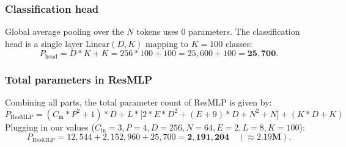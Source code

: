 \subsubsection{Classification head}
Global average pooling over the $N$ tokens uses 0 parameters. The classification head is a single layer $\text{Linear}(D, K)$ mapping to $K=100$ classes:
\begin{equation}
    P_{\text{head}} = D * K + K = 256 * 100 + 100 = 25,600 + 100 = \mathbf{25,700}.
\end{equation}

\subsubsection{Total parameters in ResMLP}
Combining all parts, the total parameter count of ResMLP is given by:
\begin{equation}
    \label{eq:resmlp_param_formula}
    \boxed{P_{\text{ResMLP}} = (C_{\text{in}} * P^2 + 1) * D + L * \Big[ 2 * E * D^2 + (E + 9) * D + N^2 + N \Big] + (K * D + K)}
\end{equation}
Plugging in our values ($C_{\text{in}}=3, P=4, D=256, N=64, E=2, L=8, K=100$):
\begin{equation}
    P_{\text{ResMLP}} = 12,544 + 2,152,960 + 25,700 = \mathbf{2,191,204} \quad (\approx \mathbf{2.19\text{M}}).
\end{equation}

\begin{table}[t]
\centering
{}
\vspace{0.6em}
\caption{Layer-by-layer parameter breakdown of ResMLP ($D=256, L=8, E=2$).}
\label{tab:resmlp_breakdown}
\end{table}

